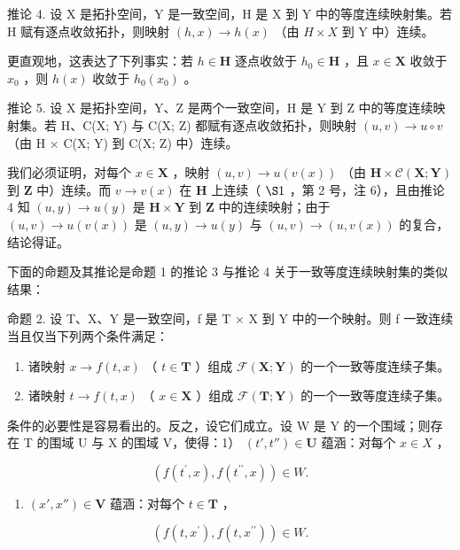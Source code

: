 推论 4. 设 X 是拓扑空间，Y 是一致空间，H 是 X 到 Y 中的等度连续映射集。若 H 赋有逐点收敛拓扑，则映射 \((h, x) \to h(x)\) （由 \(H \times X\) 到 Y 中）连续。

更直观地，这表达了下列事实：若 \(h \in \mathbf{H}\) 逐点收敛于 \(h_0 \in \mathbf{H}\) ，且 \(x \in \mathbf{X}\) 收敛于 \(x_0\) ，则 \(h(x)\) 收敛于 \(h_0(x_0)\) 。

推论 5. 设 X 是拓扑空间，Y、Z 是两个一致空间，H 是 Y 到 Z 中的等度连续映射集。若 H、C(X; Y) 与 C(X; Z) 都赋有逐点收敛拓扑，则映射 \((u, v) \to u \circ v\) （由 H × C(X; Y) 到 C(X; Z) 中）连续。

我们必须证明，对每个 \(x \in \mathbf{X}\) ，映射 \((u, v) \to u(v(x))\) （由 \(\mathbf{H} \times \mathcal{C}(\mathbf{X}; \mathbf{Y})\) 到 \(\mathbf{Z}\) 中）连续。而 \(v \to v(x)\) 在 \(\mathbf{H}\) 上连续（ \(\S 1\) ，第 2 号，注 6），且由推论 4 知 \((u, y) \to u(y)\) 是 \(\mathbf{H} \times \mathbf{Y}\) 到 \(\mathbf{Z}\) 中的连续映射；由于 \((u, v) \to u(v(x))\) 是 \((u, y) \to u(y)\) 与 \((u, v) \to (u, v(x))\) 的复合，结论得证。

下面的命题及其推论是命题 1 的推论 3 与推论 4 关于一致等度连续映射集的类似结果：

命题 2. 设 T、X、Y 是一致空间，f 是 T × X 到 Y 中的一个映射。则 f 一致连续当且仅当下列两个条件满足：

\begin{enumerate}
\def\labelenumi{\arabic{enumi})}
\item
  诸映射 \(x \to f(t, x)\) （ \(t \in \mathbf{T}\) ）组成 \(\mathcal{F}(\mathbf{X}; \mathbf{Y})\) 的一个一致等度连续子集。
\item
  诸映射 \(t \to f(t, x)\) （ \(x \in \mathbf{X}\) ）组成 \(\mathcal{F}(\mathbf{T}; \mathbf{Y})\) 的一个一致等度连续子集。
\end{enumerate}

条件的必要性是容易看出的。反之，设它们成立。设 W 是 Y 的一个围域；则存在 T 的围域 U 与 X 的围域 V，使得：1） \((t', t'') \in \mathbf{U}\) 蕴涵：对每个 \(x \in X\) ，

\[
\left(f \left(t ^ {\prime}, x\right), f \left(t ^ {\prime \prime}, x\right)\right) \in W.
\]

\begin{enumerate}
\def\labelenumi{\arabic{enumi})}
\setcounter{enumi}{1}
\tightlist
\item
  \((x', x'') \in \mathbf{V}\) 蕴涵：对每个 \(t \in \mathbf{T}\) ，
\end{enumerate}

\[
(f (t, x ^ {\prime}), f (t, x ^ {\prime \prime})) \in W.
\]

